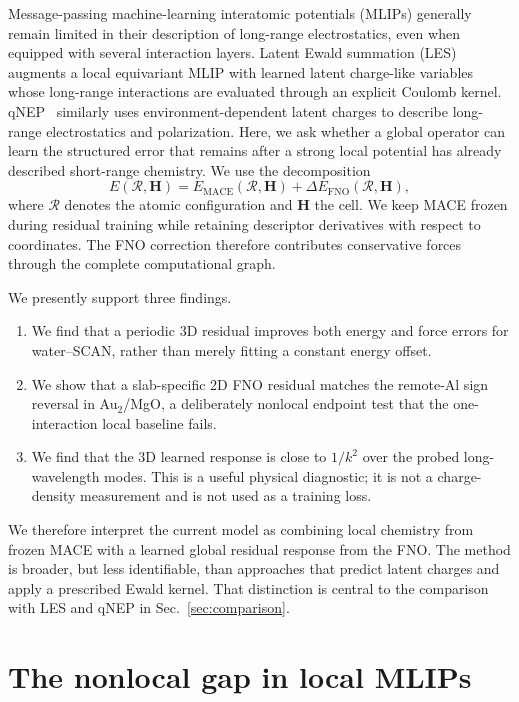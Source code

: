 \documentclass[11pt]{article}
\begin{document}
Message-passing machine-learning interatomic potentials (MLIPs) generally
remain limited in their description of long-range electrostatics, even when
equipped with several interaction layers. Latent Ewald summation
(LES)~\citep{cheng2025les} augments a local equivariant MLIP with learned
latent charge-like variables whose long-range interactions are evaluated
through an explicit Coulomb kernel. qNEP~\citep{fan2026qnep} similarly uses
environment-dependent latent charges to describe long-range electrostatics
and polarization. Here, we ask whether a global operator can learn the
structured error that remains after a strong local potential has already
described short-range chemistry. We use the decomposition
\begin{equation}
 E(\mathcal R,\mathbf H)=E_{\mathrm{MACE}}(\mathcal R,\mathbf H)
 +\Delta E_{\mathrm{FNO}}(\mathcal R,\mathbf H),
 \label{eq:decomposition}
\end{equation}
where \(\mathcal R\) denotes the atomic configuration and \(\mathbf H\) the
cell. We keep MACE frozen during residual training while retaining descriptor
derivatives with respect to coordinates. The FNO correction therefore
contributes conservative forces through the complete computational graph.

We presently support three findings.
\begin{enumerate}
 \item We find that a periodic 3D residual improves both energy and force errors for
 water--SCAN, rather than merely fitting a constant energy offset.
 \item We show that a slab-specific 2D FNO residual matches the remote-Al sign reversal in
 Au$_2$/MgO, a deliberately nonlocal endpoint test that the one-interaction
 local baseline fails.
 \item We find that the 3D learned response is close to \(1/k^2\) over the probed
 long-wavelength modes. This is a useful physical diagnostic; it is not a
 charge-density measurement and is not used as a training loss.
\end{enumerate}

We therefore interpret the current model as combining local chemistry from
frozen MACE with a learned global residual response from the FNO. The method
is broader, but less identifiable, than approaches that predict
latent charges and apply a prescribed Ewald kernel. That distinction is
central to the comparison with LES and qNEP in Sec.~\ref{sec:comparison}.

\section{The nonlocal gap in local MLIPs}
\end{document}
